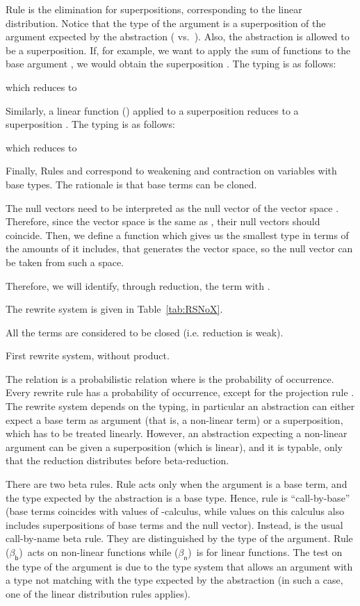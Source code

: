 \documentclass[preprint]{elsarticle}
\newcommand\s[1]{\ensuremath{\mathsf{#1}}}
\newcommand\rbetab{(\s{\beta_b})}
\newcommand\rbetan{(\s{\beta_n})}
\begin{document}
Rule  is the elimination for superpositions, corresponding to
the linear distribution. Notice that the type of the argument is a superposition
of the argument expected by the abstraction ( vs.~). Also, the
abstraction is allowed to be a superposition. If, for example, we want to apply
the sum of functions  to the base argument , we would obtain
the superposition . The typing is as follows:


which reduces to


Similarly, a linear function () applied to a
superposition  reduces to a superposition . The typing is as follows:

which reduces to



Finally, Rules  and  correspond to weakening and contraction on variables
with base types. The rationale is that base terms can be cloned.

The null vectors  need to be interpreted as the null vector of the vector
space . Therefore, since the vector space  is the same as ,
their null vectors should coincide. Then, we define a function 
which gives us the smallest type in terms of the amounts of  it includes, that generates the vector space, so the null vector can be
taken from such a space.

Therefore, we will identify, through reduction, the term  with .

The rewrite system is given in Table~\ref{tab:RSNoX}.
\begin{table}
  \vspace{-3mm}
  
  \centering
  All the terms are considered to be closed (i.e. reduction is weak).
  \caption{First rewrite system, without product.}
  \label{tab:RSNoX}
\end{table}
The relation  is a probabilistic relation where  is the probability of
occurrence. Every rewrite rule has a probability  of occurrence, except for
the projection rule . The rewrite system depends on the typing, in
particular an abstraction can either expect a base term as argument (that is, a
non-linear term) or a superposition, which has to be treated linearly. However,
an abstraction expecting a non-linear argument can be given a superposition
(which is linear), and it is typable, only that the reduction distributes before
beta-reduction.

There are two beta rules. Rule  acts only when the argument is a base
term, and the type expected by the abstraction is a base type. Hence, rule
 is ``call-by-base'' (base terms coincides with values of
-calculus, while values on this calculus also includes superpositions
of base terms and the null vector). Instead,  is the usual call-by-name
beta rule. They are distinguished by the type of the argument. Rule \rbetab\
acts on non-linear functions while \rbetan\ is for linear functions. The test on
the type of the argument is due to the type system that allows an argument with
a type not matching with the type expected by the abstraction (in such a case,
one of the linear distribution rules applies).
\end{document}
